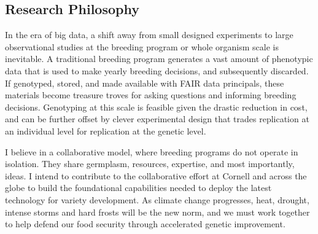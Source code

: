 \documentclass[11pt]{article}
\begin{document}





\subsection*{Research Philosophy}

In the era of big data, a shift away from small designed experiments to large observational studies at the breeding program or whole organism scale is inevitable. A traditional breeding program generates a vast amount of phenotypic data that is used to make yearly breeding decisions, and subsequently discarded. If genotyped, stored, and made available with FAIR data principals, these materials become treasure troves for asking questions and informing breeding decisions. Genotyping at this scale is feasible given the drastic reduction in cost, and can be further offset by clever experimental design that trades replication at an individual level for replication at the genetic level.


I believe in a collaborative model, where breeding programs do not operate in isolation. They share germplasm, resources, expertise, and most importantly, ideas. I intend to contribute to the collaborative effort at Cornell and across the globe to build the foundational capabilities needed to deploy the latest technology for variety development. As climate change progresses, heat, drought, intense storms and hard frosts will be the new norm, and we must work together to help defend our food security through accelerated genetic improvement. 

\end{document}
